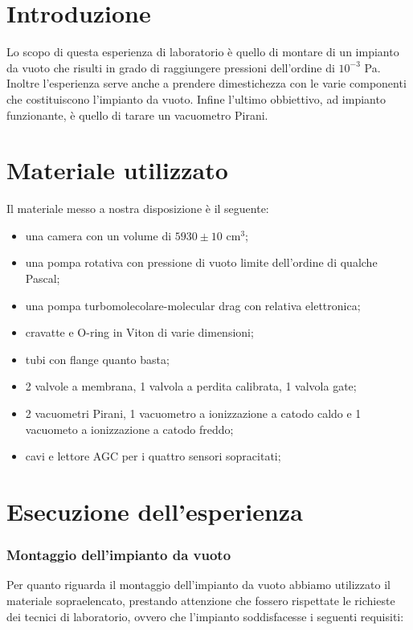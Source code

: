 \section{Introduzione}

Lo scopo di questa esperienza di laboratorio è quello di montare di un impianto da vuoto che risulti in
grado di raggiungere pressioni dell'ordine di $10^{-3}$ \si{\pascal}. Inoltre l'esperienza serve anche a
prendere dimestichezza con le varie componenti che costituiscono l'impianto da vuoto.
Infine l'ultimo obbiettivo, ad impianto funzionante, è quello di tarare un vacuometro Pirani.

\section{Materiale utilizzato}

Il materiale messo a nostra disposizione è il seguente:

\begin{itemize}
	\item{una camera con un volume di $5930 \pm 10$ \si{\centi\metre}$^3$;}
	\item{una pompa rotativa con pressione di vuoto limite dell'ordine di qualche Pascal;}
	\item{una pompa turbomolecolare-molecular drag con relativa elettronica;}
	\item{cravatte e O-ring in Viton di varie dimensioni;}
	\item{tubi con flange quanto basta;}
	\item{2 valvole a membrana, 1 valvola a perdita calibrata, 1 valvola gate;}
	\item{2 vacuometri Pirani, 1 vacuometro a ionizzazione a catodo caldo e 1 vacuometo a ionizzazione a catodo freddo;}
	\item{cavi e lettore AGC per i quattro sensori sopracitati;}
\end{itemize}

\section{Esecuzione dell'esperienza}

\subsubsection{Montaggio dell'impianto da vuoto}

Per quanto riguarda il montaggio dell'impianto da vuoto abbiamo utilizzato il materiale sopraelencato,
prestando attenzione che fossero rispettate le richieste dei tecnici di laboratorio,
ovvero che l'impianto soddisfacesse i seguenti requisiti:

